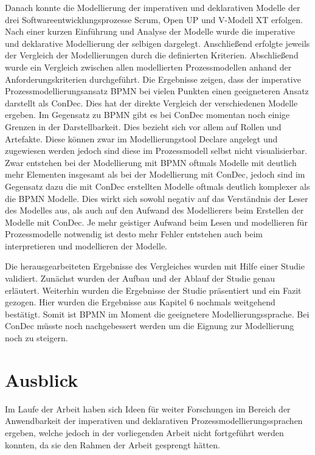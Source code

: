Danach konnte die Modellierung der imperativen und deklarativen Modelle der drei Softwareentwicklungsprozesse Scrum, Open UP und V-Modell XT erfolgen. Nach einer kurzen Einführung und Analyse der Modelle wurde die imperative und deklarative Modellierung der selbigen dargelegt. Anschließend erfolgte jeweils der Vergleich der Modellierungen durch die definierten Kriterien. Abschließend wurde ein Vergleich zwischen allen modellierten Prozessmodellen anhand der Anforderungskriterien durchgeführt. \newline
Die Ergebnisse zeigen, dass der imperative Prozessmodellierungsansatz BPMN bei vielen Punkten einen geeigneteren Ansatz darstellt als ConDec. Dies hat der direkte Vergleich der verschiedenen Modelle ergeben. Im Gegensatz zu BPMN gibt es bei ConDec momentan noch einige Grenzen in der Darstellbarkeit. Dies bezieht sich vor allem auf Rollen und Artefakte. Diese können zwar im Modellierungstool Declare angelegt und zugewiesen werden jedoch sind diese im Prozessmodell selbst nicht visualisierbar. Zwar entstehen bei der Modellierung mit BPMN oftmals Modelle mit deutlich mehr Elementen insgesamt als bei der Modellierung mit ConDec, jedoch sind im Gegensatz dazu die mit ConDec erstellten Modelle oftmals deutlich komplexer als die BPMN Modelle. Dies wirkt sich sowohl negativ auf das Verständnis der Leser des Modelles aus, als auch auf den Aufwand des Modellierers beim Erstellen der Modelle mit ConDec. Je mehr geistiger Aufwand beim Lesen und modellieren für Prozessmodelle notwendig ist desto mehr Fehler entstehen auch beim interpretieren und modellieren der Modelle. \newline

Die herausgearbeiteten Ergebnisse des Vergleiches wurden mit Hilfe einer Studie validiert. Zunächst wurden der Aufbau und der Ablauf der Studie genau erläutert. Weiterhin wurden die Ergebnisse der Studie präsentiert und ein Fazit gezogen. Hier wurden die Ergebnisse aus Kapitel 6 nochmals weitgehend bestätigt. Somit ist BPMN im Moment die geeignetere Modellierungssprache. Bei ConDec müsste noch nachgebessert werden um die Eignung zur Modellierung noch zu steigern.\newline


\section{Ausblick}

Im Laufe der Arbeit haben sich Ideen für weiter Forschungen im Bereich der Anwendbarkeit der imperativen und deklarativen Prozessmodellierungssprachen ergeben, welche jedoch in der vorliegenden Arbeit nicht fortgeführt werden konnten, da sie den Rahmen der Arbeit gesprengt hätten.\newline

